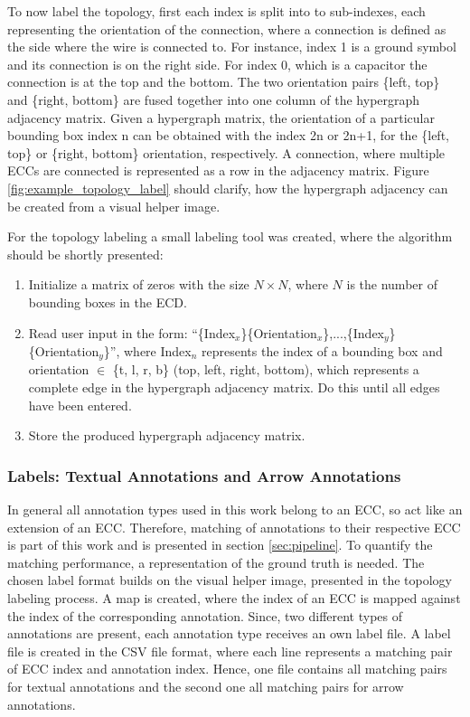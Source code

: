 To now label the topology, first each index is split into to sub-indexes, each representing the orientation of the connection, where a connection is defined as the side where the wire is connected to.
For instance, index 1 is a ground symbol and its connection is on the right side.
For index 0, which is a capacitor the connection is at the top and the bottom.
The two orientation pairs \{left, top\} and \{right, bottom\} are fused together into one column of the hypergraph adjacency matrix.
Given a hypergraph matrix, the orientation of a particular bounding box index n can be obtained with the index 2n or 2n+1, for the \{left, top\} or \{right, bottom\} orientation, respectively.
A connection, where multiple \acp{ECC} are connected is represented as a row in the adjacency matrix.
Figure \ref{fig:example_topology_label} should clarify, how the hypergraph adjacency can be created from a visual helper image.

For the topology labeling a small labeling tool was created, where the algorithm should be shortly presented:

\begin{enumerate}
    \item Initialize a matrix of zeros with the size $N \times N$, where $N$ is the number of bounding boxes in the \ac{ECD}.
    \item Read user input in the form: ``\{Index$_x$\}\{Orientation$_x$\},...,\{Index$_y$\}\{Orientation$_y$\}'', where Index$_n$ represents the index of a bounding box and orientation $\in$ \{t, l, r, b\} (top, left, right, bottom),  which represents a complete edge in the hypergraph adjacency matrix. Do this until all edges have been entered.
    \item Store the produced hypergraph adjacency matrix.
\end{enumerate}


\subsubsection{Labels: Textual Annotations and Arrow Annotations}

In general all annotation types used in this work belong to an \ac{ECC}, so act like an extension of an \ac{ECC}.
Therefore, matching of annotations to their respective \ac{ECC} is part of this work and is presented in section \ref{sec:pipeline}.
To quantify the matching performance, a representation of the ground truth is needed.
The chosen label format builds on the visual helper image, presented in the topology labeling process.
A map is created, where the index of an \ac{ECC} is mapped against the index of the corresponding annotation.
Since, two different types of annotations are present, each annotation type receives an own label file.
A label file is created in the \ac{CSV} file format, where each line represents a matching pair of \ac{ECC} index and annotation index.
Hence, one file contains all matching pairs for textual annotations and the second one all matching pairs for arrow annotations.
